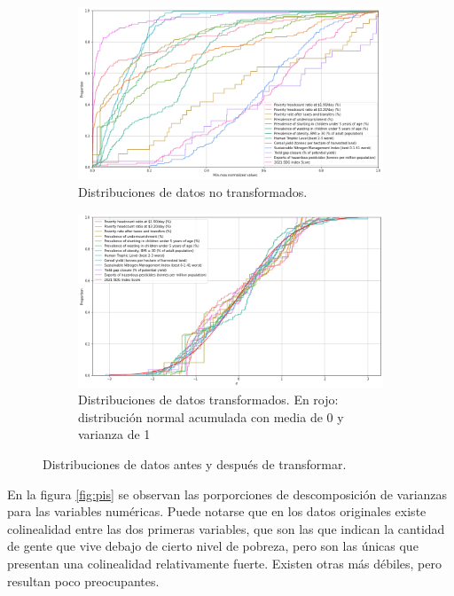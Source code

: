 \documentclass[a4paper,12pt]{amsart}
\begin{document}
    \begin{figure}[h!]
        \begin{subfigure}[t]{0.49\linewidth}
            \includegraphics[width=\linewidth]{Images/CDF_no_transformado.png}
            \caption{Distribuciones de datos no transformados.}
        \end{subfigure}
        \begin{subfigure}[t]{0.49\linewidth}
            \includegraphics[width=\linewidth]{Images/CDF_transformado.png}
            \caption{Distribuciones de datos transformados. En rojo: distribución normal acumulada con media de 0 y varianza de 1}
        \end{subfigure}
        \caption{Distribuciones de datos antes y después de transformar.}\label{fig:distributions}
    \end{figure}

    En la figura \ref{fig:pis} se observan las porporciones de descomposición de 
    varianzas para las variables numéricas. Puede notarse que en los datos originales 
    existe colinealidad entre las dos primeras variables, que son las que indican 
    la cantidad de gente que vive debajo de cierto nivel de pobreza, pero son las únicas 
    que presentan una colinealidad relativamente fuerte. Existen otras más débiles, 
    pero resultan poco preocupantes.
\end{document}
